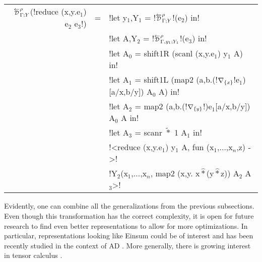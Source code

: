 \begin{center}
\begin{tabular}{r c l}
    $\directD{\rho}{\Gamma}{Y}$(!reduce (x,y.e$_{1}$) e$_{2}$ e$_{3}$!) &=&
    !let y$_{1}$,Y$_{1}$ = !$\directD{\rho}{\Gamma}{Y}$!(e$_{2}$) in! \\
    && !let A,Y$_{2}$ = !$\directD{\rho}{\Gamma,y_1}{Y_1}$!(e$_{3}$) in! \\
    && !let A$_{0}$ = shift1R (scanl (x,y.e$_{1}$) y$_{1}$ A) in! \\
    && !let A$_{1}$ = shift1L (map2 (a,b.(!$\nabla_{\{x\}}$!e$_{1}$)[a/x,b/y]) A$_{0}$ A) in! \\
    && !let A$_{2}$ = map2 (a,b.(!$\nabla_{\{y\}}$!)e$_{1}$[a/x,b/y]) A$_{0}$ A in! \\
    && !let A$_{3}$ = scanr $\widetilde{*}$ 1 A$_{1}$ in! \\
    && !<reduce (x,y.e$_{1}$) y$_{1}$ A, fun (x$_{1}$,$\ldots$,x$_n$,z) ->! \\
    && !Y$_{2}$(x$_{1}$,$\ldots$,x$_n$, map2 (x,y. x$\widehat{*}$(y$\widehat{*}$z)) A$_{2}$ A$_{3}$>! \\
\end{tabular}
\end{center}

Evidently, one can combine all the generalizations from the previous subsections.
Even though this transformation has the correct complexity, it is open for future research to find
even better representations to allow for more optimizations. 
In particular, representations looking like Einsum \cite{van2011numpy} could be of interest 
and has been recently studied in the context of AD \cite{laue2018computing,laue2020simple}.
More generally, there is growing interest in tensor calculus \cite{liao2019differentiable,bernstein2020differentiating}.
